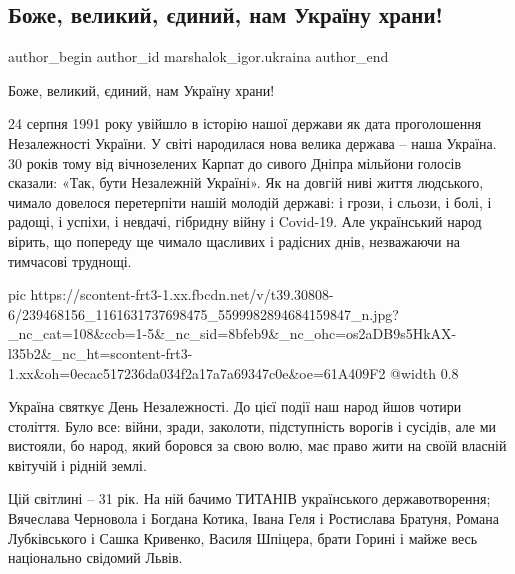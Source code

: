  
 
 
 
 
 
\subsection{Боже, великий, єдиний, нам Україну храни!}
\label{sec:17_08_2021.fb.marshalok_igor.ukraina.1.bozhe_ukrainu_hrani}
 
\ifcmt
 author_begin
   author_id marshalok_igor.ukraina
 author_end
\fi

Боже, великий, єдиний, нам Україну храни!

24 серпня 1991 року увійшло в історію нашої держави як дата проголошення
Незалежності України. У світі народилася нова велика держава – наша Україна. 30
років тому від вічнозелених Карпат до сивого Дніпра мільйони голосів сказали:
«Так, бути Незалежній Україні». Як на довгій ниві життя людського, чимало
довелося перетерпіти нашій молодій державі: і грози, і сльози, і болі, і
радощі, і успіхи, і невдачі, гібридну війну і Covid-19. Але український народ
вірить, що попереду ще чимало щасливих і радісних днів, незважаючи на тимчасові
труднощі.

\ifcmt
  pic https://scontent-frt3-1.xx.fbcdn.net/v/t39.30808-6/239468156_1161631737698475_5599982894684159847_n.jpg?_nc_cat=108&ccb=1-5&_nc_sid=8bfeb9&_nc_ohc=os2aDB9s5HkAX-l35b2&_nc_ht=scontent-frt3-1.xx&oh=0ecac517236da034f2a17a7a69347c0e&oe=61A409F2
  @width 0.8
\fi

Україна святкує День Незалежності. До цієї події наш народ йшов чотири
століття. Було все: війни, зради, заколоти, підступність ворогів і сусідів, але
ми вистояли, бо народ, який боровся за свою волю, має право жити на своїй
власній квітучій і рідній землі.

Цій світлині – 31 рік. На ній бачимо ТИТАНІВ українського державотворення;
Вячеслава Черновола і Богдана Котика, Івана Геля і Ростислава Братуня, Романа
Лубківського і Сашка Кривенко, Василя Шпіцера, брати Горині і майже весь
національно свідомий Львів.

